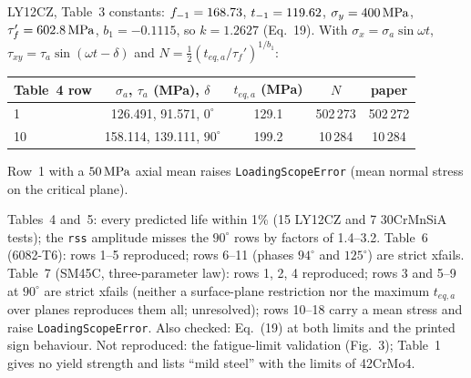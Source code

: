  LY12CZ, Table~3 constants: $f_{-1}=168.73$, $t_{-1}=119.62$, $\sigma_y=400\,\mathrm{MPa}$,
$\tau_f'=602.8\,\mathrm{MPa}$, $b_1=-0.1115$, so $k=1.2627$ (Eq.~19). With
$\sigma_x=\sigma_a\sin\omega t$, $\tau_{xy}=\tau_a\sin(\omega t-\delta)$ and
$N=\tfrac12(t_{eq,a}/\tau_f')^{1/b_1}$:
\begin{center}\small
\begin{tabular}{@{}lcccc@{}}
\toprule
Table~4 row & $\sigma_a$, $\tau_a$ (MPa), $\delta$ & $t_{eq,a}$ (MPa) & $N$ & paper\\\midrule
1 & 126.491, 91.571, $0^\circ$ & 129.1 & 502\,273 & 502\,272\\
10 & 158.114, 139.111, $90^\circ$ & 199.2 & 10\,284 & 10\,284\\
\bottomrule
\end{tabular}
\end{center}
Row~1 with a $50\,\mathrm{MPa}$ axial mean raises \texttt{LoadingScopeError} (mean normal stress on the critical
plane).

 Tables~4 and~5: every predicted life within 1\% (15 LY12CZ and 7 30CrMnSiA
tests); the \texttt{rss} amplitude misses the $90^\circ$ rows by factors of 1.4--3.2. Table~6
(6082-T6): rows 1--5 reproduced; rows 6--11 (phases $94^\circ$ and $125^\circ$) are strict xfails.
Table~7 (SM45C, three-parameter law): rows 1, 2, 4 reproduced; rows 3 and 5--9 at $90^\circ$ are
strict xfails (neither a surface-plane restriction nor the maximum $t_{eq,a}$ over planes reproduces
them all; unresolved); rows 10--18 carry a mean stress and raise \texttt{LoadingScopeError}. Also
checked: Eq.~(19) at both limits and the printed sign behaviour. Not reproduced: the fatigue-limit
validation (Fig.~3); Table~1 gives no yield strength and lists ``mild steel'' with the limits of
42CrMo4.
